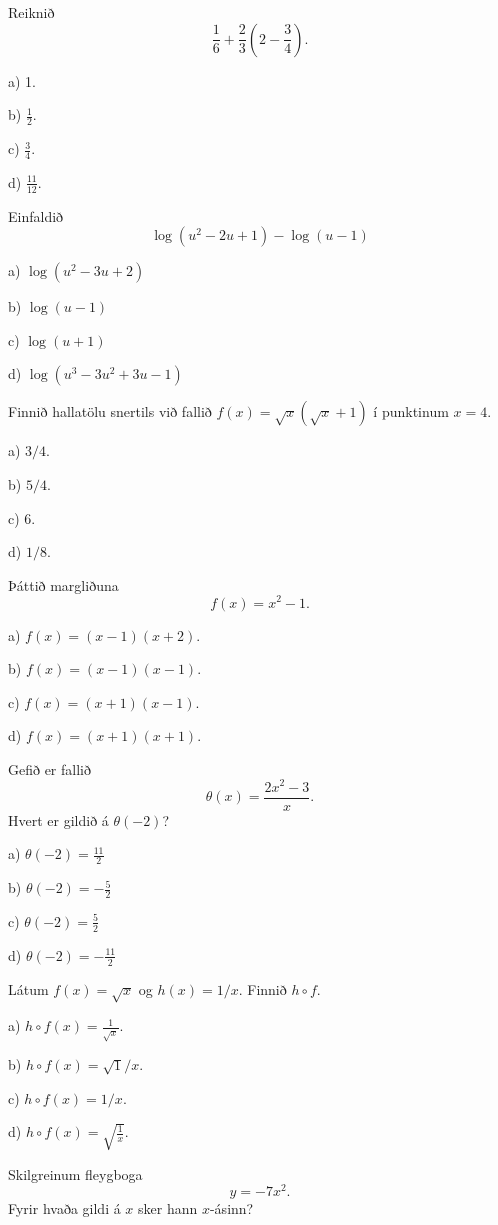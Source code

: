 \item Reiknið
\[
\frac{1}{6} + \frac{2}{3} \left( 2 - \frac{3}{4} \right).
\]

a) 1. %

b) $ \frac{1}{2}$.

c) $ \frac{3}{4}$.

d) $ \frac{11}{12}$.


\item Einfaldið
$$\log(u^2-2u+1)-\log(u-1)$$

a) $\log(u^2-3u+2)$

b) $\log(u-1)$ %

c) $\log(u+1)$

d) $\log(u^3-3u^2+3u-1)$


\item Finnið hallatölu snertils við fallið $f(x) = \sqrt x
\left( \sqrt{x} + 1\right)$ í punktinum $x=4$.

a) $3/4$.

b) $5/4$. %

c) $6$.

d) $1/8$.


\item Þáttið margliðuna $$f(x) = x^2 -1.$$

a) $f(x) = (x-1)(x+2)$.

b) $f(x) = (x-1)(x-1)$.

c) $f(x) = (x+1)(x-1)$. %

d) $f(x) = (x+1)(x+1)$.


\item Gefið er fallið $$\displaystyle\theta(x)=\frac{2x^2-3}{x}.$$ Hvert er gildið á $\theta(-2)$?

a) $\theta(-2)=\frac{11}{2}$

b) $\theta(-2)=-\frac{5}{2}$ %

c) $\theta(-2)=\frac{5}{2}$

d) $\theta(-2)=-\frac{11}{2}$


\item Látum $f(x)=\sqrt x$ og $h(x)=1/x$. Finnið $h\circ f$.

a) $h\circ f(x) = \frac{1}{\sqrt x}$. %

b) $h \circ f(x) = \sqrt{1}/x$.

c) $h \circ f(x) = 1/x$.

d) $h \circ f(x) = \sqrt{\frac 1x}$.


\item Skilgreinum fleygboga $$y=- 7 x^{2}.$$ Fyrir hvaða gildi á $x$ sker hann $x$-ásinn?

